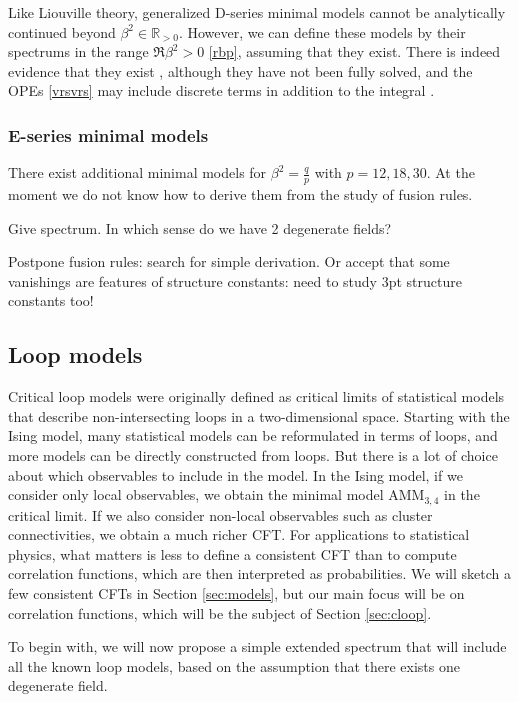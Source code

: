 \documentclass[12pt, a4paper]{article}
\theoremstyle{break}
\begin{document}
Like Liouville theory, generalized D-series minimal models cannot be analytically continued beyond $\beta^2\in \mathbb{R}_{>0}$. However, we can define these models by their spectrums in the range $\Re\beta^2>0$ \eqref{rbp}, assuming that they exist. There is indeed evidence that they exist \cite{mr17}, although they have not been fully solved, and the OPEs \eqref{vrsvrs} may include discrete terms in addition to the integral \cite{rib19}. 


\subsubsection{E-series minimal models}

There exist additional minimal models for $\beta^2=\frac{q}{p}$ with $p=12, 18, 30$. At the moment we do not know how to derive them from the study of fusion rules. 

Give spectrum. In which sense do we have 2 degenerate fields? 

Postpone fusion rules: search for simple derivation. Or accept that some vanishings are features of structure constants: need to study 3pt structure constants too! 


\subsection{Loop models}

Critical loop models were originally defined as critical limits of statistical models that describe non-intersecting loops in a two-dimensional space. Starting with the Ising model, many statistical models can be reformulated in terms of loops, and more models can be directly constructed from loops. But there is a lot of choice about which observables to include in the model. In the Ising model, if we consider only local observables, we obtain the minimal model $\text{AMM}_{3,4}$ in the critical limit. If we also consider non-local observables such as cluster connectivities, we obtain a much richer CFT. For applications to statistical physics, what matters is less to define a consistent CFT than to compute correlation functions, which are then interpreted as probabilities. We will sketch a few consistent CFTs in Section \ref{sec:models}, but our main focus will be on correlation functions, which will be the subject of Section \ref{sec:cloop}.

To begin with, we will now propose a simple extended spectrum that will include all the known loop models, based on the assumption that there exists one degenerate field. 
\end{document}
